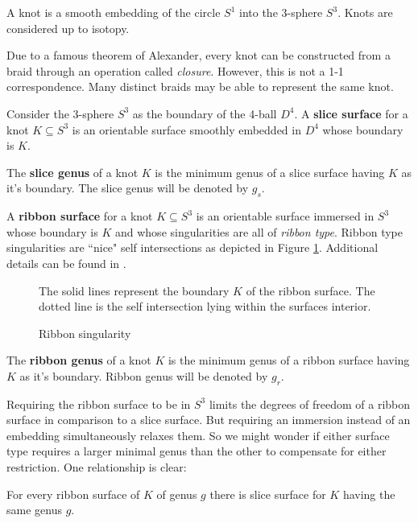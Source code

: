 \documentclass[12pt]{thesis}
\begin{document}
\begin{definition}
    A knot is a smooth embedding of the circle $S^{1}$ into the 3-sphere $S^{3}$.
    Knots are considered up to isotopy.
\end{definition}

Due to a famous theorem of Alexander, every knot 
can be constructed from a braid through an operation
called \textit{closure}.
However, this is not a 1-1 correspondence.
Many distinct braids may be able to represent the same knot.

\begin{definition}
Consider the 3-sphere $S^{3}$ as the boundary of the 4-ball $D^{4}$.
A \textbf{slice surface} for a knot $K \subseteq S^{3}$
is an orientable surface smoothly embedded in $D^{4}$ 
whose boundary is $K$.
\end{definition}

\begin{definition}
    The \textbf{slice genus} of a knot $K$ is the minimum genus
    of a slice surface having $K$ as it's boundary.
    The slice genus will be denoted by $g_{s}$.
\end{definition}

\begin{definition}
    A \textbf{ribbon surface} for a knot $K \subseteq S^{3}$
    is an orientable surface immersed in $S^{3}$
    whose boundary is $K$
    and whose singularities are all of \textit{ribbon type}.
    Ribbon type singularities are ``nice" self intersections
    as depicted in Figure \ref{fig:ribbon-singularity}.
    Additional details can be found in \cite{on-braided-surfaces}.
\end{definition}

\begin{figure}[h]
    \centering
    \def\svgwidth{6cm}
    
    \caption{Ribbon singularity}

    The solid lines represent the boundary $K$
    of the ribbon surface. The dotted line
    is the self intersection lying within the
    surfaces interior.
    \label{fig:ribbon-singularity}
\end{figure}


\begin{definition}
    The \textbf{ribbon genus} of a knot $K$ is the minimum genus
    of a ribbon surface having $K$ as it's boundary.
    Ribbon genus will be denoted by $g_{r}$.
\end{definition}

Requiring the ribbon surface to be in $S^{3}$
limits the degrees of freedom of a ribbon surface in comparison to a slice surface.
But requiring an immersion instead of an embedding simultaneously relaxes them.
So we might wonder if either surface type requires a larger minimal genus than the other
to compensate for either restriction.
One relationship is clear:
\begin{proposition}
    For every ribbon surface of $K$ of genus $g$
    there is slice surface for $K$ having the same genus $g$.
\end{proposition}
\end{document}
